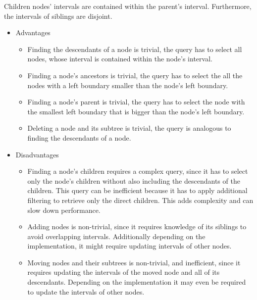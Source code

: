 \begin{itemize}
    Children nodes' intervals are contained within the parent's interval. Furthermore, the
    intervals of siblings are disjoint.
    \begin{itemize}
      \item Advantages
        \begin{itemize}
        \item Finding the descendants of a node is trivial, the query has to select all
          nodes, whose interval is contained within the node's interval.
        \item Finding a node's ancestors is trivial, the query has to select the all the
          nodes with a left boundary smaller than the node's left boundary. 
        \item Finding a node's parent is trivial, the query has to select the node with
          the smallest left boundary that is bigger than the node's left boundary.
        \item Deleting a node and its subtree is trivial, the query is analogous to finding
          the descendants of a node.
        \end{itemize}
      \item Disadvantages
        \begin{itemize}
        \item Finding a node's children requires a complex query, since it has to select
          only the node's children without also including the descendants of the
            children. This query can be inefficient because it has to apply additional filtering
            to retrieve only the direct children. This adds complexity and can slow down
            performance.
        \item Adding nodes is non-trivial, since it requires knowledge of its siblings to
          avoid overlapping intervals. Additionally depending on the implementation, it
            might require updating intervals of other nodes.
        \item Moving nodes and their subtrees is non-trivial, and inefficient, since it requires updating
          the intervals of the moved node and all of its descendants. 
        Depending on the implementation it may even be required to update the intervals of
            other nodes.
      \end{itemize}
    \end{itemize}

\end{itemize}
